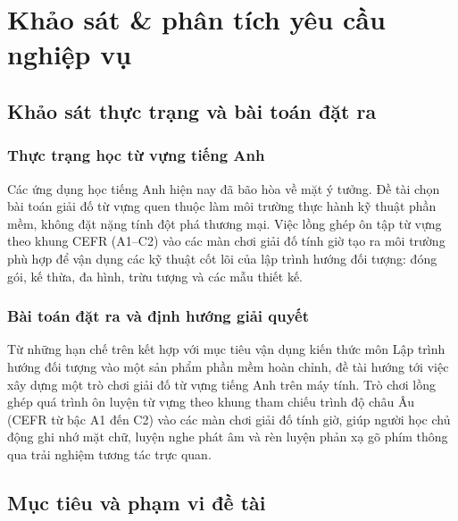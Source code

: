 \chapter{Khảo sát \& phân tích yêu cầu nghiệp vụ}
\label{chap:survey_and_business_requirements}
\label{chap:introduction}

\section{Khảo sát thực trạng và bài toán đặt ra}
\label{sec:survey_problem}
\label{sec:overview}

\subsection{Thực trạng học từ vựng tiếng Anh}
\label{subsec:current_situation}
Các ứng dụng học tiếng Anh hiện nay đã bão hòa về mặt ý tưởng. Đề tài chọn bài toán giải đố từ vựng quen thuộc làm môi trường thực hành kỹ thuật phần mềm, không đặt nặng tính đột phá thương mại. Việc lồng ghép ôn tập từ vựng theo khung CEFR (A1–C2) vào các màn chơi giải đố tính giờ tạo ra môi trường phù hợp để vận dụng các kỹ thuật cốt lõi của lập trình hướng đối tượng: đóng gói, kế thừa, đa hình, trừu tượng và các mẫu thiết kế.

\subsection{Bài toán đặt ra và định hướng giải quyết}
\label{subsec:problem_solution}
Từ những hạn chế trên kết hợp với mục tiêu vận dụng kiến thức môn Lập trình hướng đối tượng vào một sản phẩm phần mềm hoàn chỉnh, đề tài hướng tới việc xây dựng một trò chơi giải đố từ vựng tiếng Anh trên máy tính. Trò chơi lồng ghép quá trình ôn luyện từ vựng theo khung tham chiếu trình độ châu Âu (CEFR từ bậc A1 đến C2) vào các màn chơi giải đố tính giờ, giúp người học chủ động ghi nhớ mặt chữ, luyện nghe phát âm và rèn luyện phản xạ gõ phím thông qua trải nghiệm tương tác trực quan.

\section{Mục tiêu và phạm vi đề tài}
\label{sec:objectives_and_scope}

